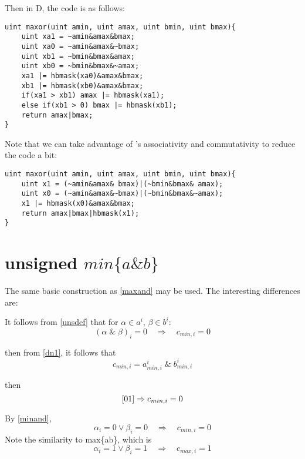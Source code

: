 \documentclass{article}
\begin{document}
Then in D, the code is as follows:
\begin{lstlisting}
uint maxor(uint amin, uint amax, uint bmin, uint bmax){
    uint xa1 = ~amin&amax&bmax;
    uint xa0 = ~amin&amax&~bmax;
    uint xb1 = ~bmin&bmax&amax;
    uint xb0 = ~bmin&bmax&~amax;
    xa1 |= hbmask(xa0)&amax&bmax;
    xb1 |= hbmask(xb0)&amax&bmax;
    if(xa1 > xb1) amax |= hbmask(xa1);
    else if(xb1 > 0) bmax |= hbmask(xb1);
    return amax|bmax;
}
\end{lstlisting}

Note that we can take advantage of \textbar's associativity and commutativity to reduce the code a bit:

\begin{lstlisting}
uint maxor(uint amin, uint amax, uint bmin, uint bmax){
    uint x1 = (~amin&amax& bmax)|(~bmin&bmax& amax);
    uint x0 = (~amin&amax&~bmax)|(~bmin&bmax&~amax);
    x1 |= hbmask(x0)&amax&bmax;
    return amax|bmax|hbmask(x1);
}
\end{lstlisting}


\section{unsigned $min \{a\&b\}$}

The same basic construction as \ref{maxand} may be used. 
The interesting differences are:

It follows from \eqref{unsdef} that for $\alpha \in a^i$, $\beta \in b^i$:
\begin{equation}
(\alpha \; \text{\&} \; \beta)_i = 0
\quad \Rightarrow \quad c_{min,i} = 0
\end{equation}

then from \eqref{dn1}, it follows that 
\begin{equation}\label{minand}
c_{min,i} = a^i_{min,i} \; \text{\&}\; b^i_{min,i}
\end{equation}

then
\begin{equation*}
\eqref{01} \Rightarrow c_{min,i} = 0
\end{equation*}

By \eqref{minand},
\begin{equation*}
\alpha_i = 0 \vee \beta_i = 0 \quad \Rightarrow \quad c_{min,i} = 0
\end{equation*}
Note the similarity to max\{a\textbar b\}, which is
\begin{equation*}
\alpha_i = 1 \vee \beta_i = 1 \quad \Rightarrow \quad c_{max,i} = 1
\end{equation*}
\end{document}
